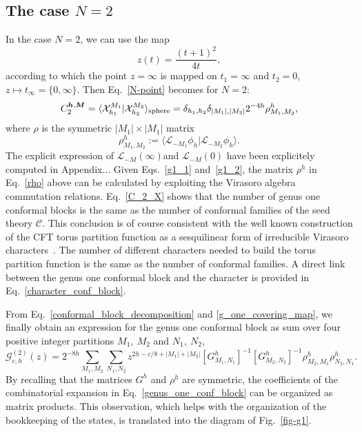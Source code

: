 \documentclass[a4paper,11pt]{article}
\begin{document}
\subsection{ The case $N=2$}
In the case $N=2$, we can use the map
\begin{equation}\label{g_one_covering_map}
 z(t)=\frac{(t+1)^2}{4t},
\end{equation}
according to which the point $z=\infty$ is mapped on $t_1=\infty$ and $t_2=0$, $z\mapsto t_{\infty}=\{0,\infty\}$.
Then Eq.~\eqref{N-point} becomes for $N=2$:
\begin{equation}\label{C_2_X}
 C_2^{\boldsymbol{h},\boldsymbol{M}}=\langle \mathcal{X}_{h_1}^{M_1} | \mathcal{X}_{h_2}^{M_2}\rangle_{\rm{sphere}}=
 \delta_{h_1, h_2}\delta_{|M_1|,|M_2|}2^{-4h}\rho^h_{M_1,M_2},
\end{equation}
where $\rho$ is the symmetric $|M_1|\times|M_1|$ matrix
\begin{equation}
\label{rho}
 \rho^h_{M_1,M_2}:=\langle\boldsymbol{\mathcal{L}}_{-M_1}\phi_{h}|\boldsymbol{\mathcal{L}}_{-M_2}\phi_{h}\rangle.
\end{equation}
The explicit expression of $\boldsymbol{\mathcal{L}}_{-M}(\infty)$and  $\boldsymbol{\mathcal{L}}_{-M}(0)$ have been explicitely computed in  Appendix... Given Eqs.~\eqref{g1_1} and~\eqref{g1_2}, the matrix $\rho^h$  in Eq.~\eqref{rho} above can be calculated by exploiting the Virasoro algebra commutation relations.
Eq.~\eqref{C_2_X} shows that the number of genus one conformal blocks is
the same as the number of conformal families of the seed theory $\mathcal{C}$.
This conclusion is of course consistent with the well known construction of the CFT torus partition function as a sesquilinear form of irreducible Virasoro characters~\cite{Cappelli, Cappelli2}. The number of different characters needed to build the torus partition function  is  the same as the number of conformal families. A direct link between the genus one conformal block and the character is provided in Eq.~\eqref{character_conf_block}.

From Eq.~\eqref{conformal_block_decomposition} and \eqref{g_one_covering_map}, we finally obtain 
an expression for the genus one conformal block as sum over four positive integer partitions $M_1,~M_2$ and $N_1,~N_2$,
\begin{equation}\label{genus_one_conf_block}
 \mathcal{G}_{c, h}^{(2)}(z)=2^{-8h}\sum_{M_1, M_2}\sum_{N_1, N_2}
 z^{2h-c/8+|M_1|+|M_2|}[G^{h}_{M_1,N_1}]^{-1}[G^{h}_{ M_2,N_2}]^{-1}
 \rho^h_{M_2,M_1}\rho^h_{N_2,N_1}.
\end{equation}
By recalling that the matrices $G^h$ and $\rho^h$ are symmetric, the coefficients of the combinatorial 
expansion in Eq.~\eqref{genus_one_conf_block} can be organized as 
matrix products. This observation, which helps with the organization of the bookkeeping of the states, is translated  into  the diagram of Fig.~\ref{fig-g1}. 
\end{document}
